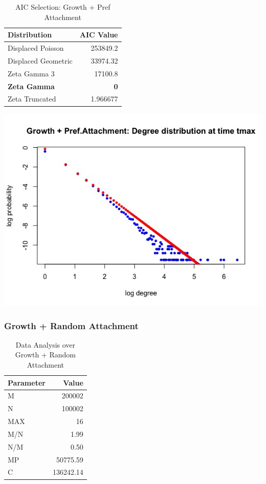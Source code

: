 \documentclass[12pt, a4paper]{article}
\begin{document}
\begin{table}[H]
    \centering
    \begin{tabular}{l r}
        Distribution & AIC Value\\
        \hline
        Displaced Poisson & 253849.2\\
        Displaced Geometric & 33974.32\\
        Zeta Gamma 3 & 17100.8\\
        \textbf{Zeta Gamma} & \textbf{0}\\ 
        Zeta Truncated & 1.966677\\
    \end{tabular}
    \caption{AIC Selection: Growth + Pref Attachment}
    \label{table:grow_pref_att_3}
\end{table}

\begin{minipage}[t]{\linewidth}
    \includegraphics[width=\textwidth]{degree_tmax_grow_pref_att}
    \captionsetup{type=figure}
    \label{fig:degree_tmax_grow_pref_att}
  \end{minipage}

\subsubsection{Growth + Random Attachment}

\begin{table}[H]
    \centering
    \begin{tabular}{l r}
        Parameter & Value\\
        \hline              
        M & 200002\\
        N & 100002\\
        MAX & 16\\
        M/N & 1.99\\
        N/M & 0.50\\
        MP & 50775.59\\
        C & 136242.14
    \end{tabular}
    \caption{Data Analysis over Growth + Random Attachment}
    \label{table:grow_ran_att_1}
\end{table}
\end{document}
